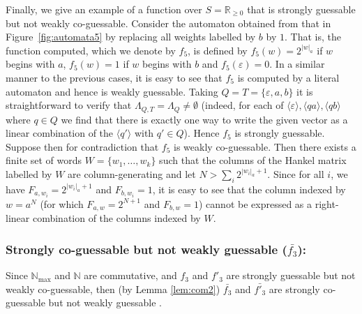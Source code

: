 \documentclass[10pt,a4paper]{amsart}
\theoremstyle{definition}
\numberwithin{equation}{section}
\numberwithin{theorem}{section}
\begin{document}
	Finally, we give an example of a function over $S=\mathbb{R}_{\geq 0}$ that is strongly guessable but not weakly co-guessable. Consider the automaton obtained from that in Figure~\ref{fig:automata5} by replacing all weights labelled by $b$ by $1$. That is, the function computed, which we denote by $f_5$, is defined by $f_5(w) = 2^{|w|_a}$ if $w$ begins with $a$,  $f_5(w) = 1$ if $w$ begins with $b$ and $f_5(\varepsilon) =0$. In a similar manner to the previous cases, it is easy to see that $f_5$ is computed by a literal automaton and hence is weakly guessable.  Taking $Q=T=\{\varepsilon, a, b\}$ it is straightforward to verify that $\Lambda_{Q, T} = \Lambda_Q \neq \emptyset$ (indeed, for each of $\langle \varepsilon \rangle, \langle q a\rangle, \langle qb \rangle$ where $q \in Q$ we find that there is exactly one way to write the given vector as a linear combination of the $\langle q' \rangle$ with $q' \in Q$). Hence $f_5$ is strongly guessable. Suppose then for contradiction that $f_5$ is weakly co-guessable. Then there exists a finite set of words $W=\{w_1, \ldots ,w_k\}$ such that the columns of the Hankel matrix labelled by $W$ are column-generating and let $N> \sum_i2^{|w_i|_a + 1}$. Since for all $i$, we have $F_{a, w_i} = 2^{|w_i|_a + 1}$ and $F_{b, w_i} = 1$, it is easy to see that the column indexed by $w = a^N$ (for which $F_{a, w} = 2^{N+1}$ and $F_{b, w} = 1$) cannot be expressed as a right-linear combination of the columns indexed by $W$.
	
	
		\subsubsection*{\textbf{Strongly co-guessable but not weakly guessable ($\bar{f_3}$):}}
		Since $\mathbb{N}_{\max}$ and $\mathbb{N}$ are commutative, and $f_3$ and $f'_3$ are strongly guessable but not weakly co-guessable, then (by Lemma \ref{lem:com2}) $\bar{f_3}$ and $\bar{f'_3}$ are strongly co-guessable but not weakly guessable .
\end{document}
